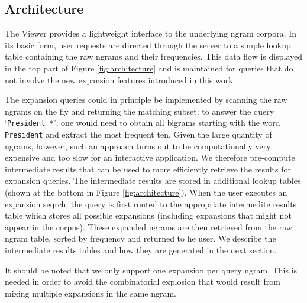 \documentclass[11pt,a4paper]{article}
\newcommand{\query}[1]{\texttt{#1}}
\begin{document}
\subsection{Architecture}
The Viewer provides a lightweight interface to the underlying ngram corpora. In its basic form, user requests are directed through the server to a simple lookup table containing the raw ngrams and their frequencies. This data flow is displayed in the top part of Figure \ref{fig:architecture} and is maintained for queries that do not involve the new expansion features introduced in this work.

The expansion queries could in principle be implemented by scanning the raw ngrams on the fly and returning the matching subset: to answer the query `\query{President *}', one would need to obtain all bigrams starting with the word \query{President} and extract the most frequent ten. Given the large quantity of ngrams, however, such an approach turns out to be computationally very expensive and too slow for an interactive application. We therefore pre-compute intermediate results that can be used to more efficiently retrieve the results for expansion queries. The intermediate results are stored in additional lookup tables (shown at the bottom in Figure \ref{fig:architecture}). When the user executes an expansion seqrch, the query is first routed to the appropriate intermedite results table which stores all possible expansions (including expansions that might not appear in the corpus).  These expanded ngrams are then retrieved from the raw ngram table, sorted by frequency and returned to he user.
We describe the intermediate results tables and how they are generated in the next section.

It should be noted that we only support one expansion per query ngram. This is needed in order to avoid the combinatorial explosion that would result from mixing multiple expansions in the same ngram.
\end{document}

